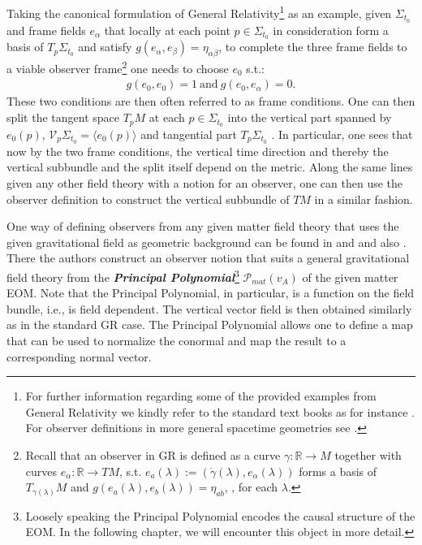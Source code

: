 Taking the canonical formulation of General Relativity\footnote{For further information regarding some of the provided examples from General Relativity we kindly refer to the standard text books as for instance \cite{Misner1973}. For observer definitions in more general spacetime geometries see \cite{2011PhRvD..83d4047R}.} as an example, given $\Sigma_{t_0}$ and frame fields $e_{\alpha}$ that locally at each point $p \in \Sigma_{t_0}$ in consideration form a basis of $T_p\Sigma_{t_0}$ and satisfy $g(e_{\alpha},e_{\beta}) = \eta_{\alpha \beta}$, to complete the three frame fields to a viable observer frame\footnote{Recall that an observer in GR is defined as a curve $\gamma : \mathbb{R} \rightarrow M$ together with curves $e_{\alpha} : \mathbb{R} \rightarrow TM$, s.t. $ e_a(\lambda) :=(\dot{\gamma}(\lambda),e_{\alpha}(\lambda))$ forms a basis of $T_{\gamma(\lambda)}M$ and $g(e_a(\lambda),e_b(\lambda)) = \eta_{ab}$, , for each $\lambda$.} one needs to choose $e_0$ s.t.:
\begin{align}
    g(e_0,e_0) = 1 \ \text{and} \ g(e_0,e_{\alpha}) = 0.
\end{align}
These two conditions are then often referred to as frame conditions. One can then split the tangent space $T_pM$ at each $p \in \Sigma_{t_0}$ into the vertical part spanned by $e_0(p)$,  $\mathcal{V}_p\Sigma_{t_0} = \langle  e_0(p) \rangle$ and tangential part $T_p\Sigma_{t_0}$ . In particular, one sees that now by the two frame conditions, the vertical time direction and thereby the vertical subbundle and the split itself depend on the metric. Along the same lines given any other field theory with a notion for an observer, one can then use the observer definition to construct the vertical subbundle of $TM$ in a similar fashion. 

One way of defining observers from any given matter field theory that uses the given gravitational field as geometric background can be found in \cite{2018PhRvD..97h4036D} and \cite{2011PhRvD..83d4047R} and also \cite{Rivera}. There the authors construct an observer notion that suits a general gravitational field theory from the \textbf{\textit{Principal Polynomial}}\footnote{Loosely speaking the Principal Polynomial encodes the causal structure of the EOM. In the following chapter, we will encounter this object in more detail.} $\mathcal{P}_{mat}(v_A)$ of the given matter EOM. Note that the Principal Polynomial, in particular, is a function on the field bundle, i.e., is field dependent. The vertical vector field is then obtained similarly as in the standard GR case. The Principal Polynomial allows one to define a map that can be used to normalize the conormal and map the result to a corresponding normal vector.

